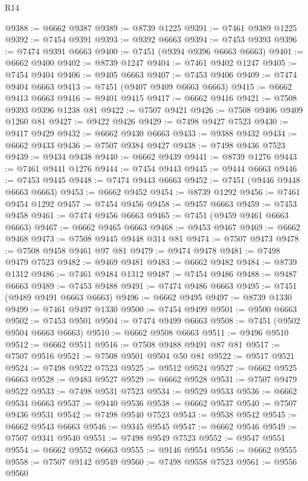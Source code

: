 \begin{lexlean}{R14}
\begin{coremodule}
@9388 := @6662 @9387
@9389 := @8739 @1225
@9391 := @7461 @9389 @1225
@9392 := @7454 @9391
@9393 := @9392 @6663
@9394 := @7453 @9393
@9396 := @7474 @9391 @6663
@9400 := @7451 (@9394 @9396 @6663 @6663)
@9401 := @6662 @9400
@9402 := @8739 @1247
@9404 := @7461 @9402 @1247
@9405 := @7454 @9404
@9406 := @9405 @6663
@9407 := @7453 @9406
@9409 := @7474 @9404 @6663
@9413 := @7451 (@9407 @9409 @6663 @6663)
@9415 := @6662 @9413 @6663
@9416 := @9401 @9415
@9417 := @6662 @9416
@9421 := @7508 @9393 @9396 @1238 @81
@9422 := @7507 @9421
@9426 := @7508 @9406 @9409 @1260 @81
@9427 := @9422 @9426
@9429 := @7498 @9427 @7523
@9430 := @9417 @9429
@9432 := @6662 @9430 @6663
@9433 := @9388 @9432
@9434 := @6662 @9433
@9436 := @7507 @9384 @9427
@9438 := @7498 @9436 @7523
@9439 := @9434 @9438
@9440 := @6662 @9439
@9441 := @8739 @1276
@9443 := @7461 @9441 @1276
@9444 := @7454 @9443
@9445 := @9444 @6663
@9446 := @7453 @9445
@9448 := @7474 @9443 @6663
@9452 := @7451 (@9446 @9448 @6663 @6663)
@9453 := @6662 @9452
@9454 := @8739 @1292
@9456 := @7461 @9454 @1292
@9457 := @7454 @9456
@9458 := @9457 @6663
@9459 := @7453 @9458
@9461 := @7474 @9456 @6663
@9465 := @7451 (@9459 @9461 @6663 @6663)
@9467 := @6662 @9465 @6663
@9468 := @9453 @9467
@9469 := @6662 @9468
@9473 := @7508 @9445 @9448 @314 @81
@9474 := @7507 @9473
@9478 := @7508 @9458 @9461 @97 @81
@9479 := @9474 @9478
@9481 := @7498 @9479 @7523
@9482 := @9469 @9481
@9483 := @6662 @9482
@9484 := @8739 @1312
@9486 := @7461 @9484 @1312
@9487 := @7454 @9486
@9488 := @9487 @6663
@9489 := @7453 @9488
@9491 := @7474 @9486 @6663
@9495 := @7451 (@9489 @9491 @6663 @6663)
@9496 := @6662 @9495
@9497 := @8739 @1330
@9499 := @7461 @9497 @1330
@9500 := @7454 @9499
@9501 := @9500 @6663
@9502 := @7453 @9501
@9504 := @7474 @9499 @6663
@9508 := @7451 (@9502 @9504 @6663 @6663)
@9510 := @6662 @9508 @6663
@9511 := @9496 @9510
@9512 := @6662 @9511
@9516 := @7508 @9488 @9491 @87 @81
@9517 := @7507 @9516
@9521 := @7508 @9501 @9504 @50 @81
@9522 := @9517 @9521
@9524 := @7498 @9522 @7523
@9525 := @9512 @9524
@9527 := @6662 @9525 @6663
@9528 := @9483 @9527
@9529 := @6662 @9528
@9531 := @7507 @9479 @9522
@9533 := @7498 @9531 @7523
@9534 := @9529 @9533
@9536 := @6662 @9534 @6663
@9537 := @9440 @9536
@9538 := @6662 @9537
@9540 := @7507 @9436 @9531
@9542 := @7498 @9540 @7523
@9543 := @9538 @9542
@9545 := @6662 @9543 @6663
@9546 := @9345 @9545
@9547 := @6662 @9546
@9549 := @7507 @9341 @9540
@9551 := @7498 @9549 @7523
@9552 := @9547 @9551
@9554 := @6662 @9552 @6663
@9555 := @9146 @9554
@9556 := @6662 @9555
@9558 := @7507 @9142 @9549
@9560 := @7498 @9558 @7523
@9561 := @9556 @9560

\end{coremodule}
\end{lexlean}
